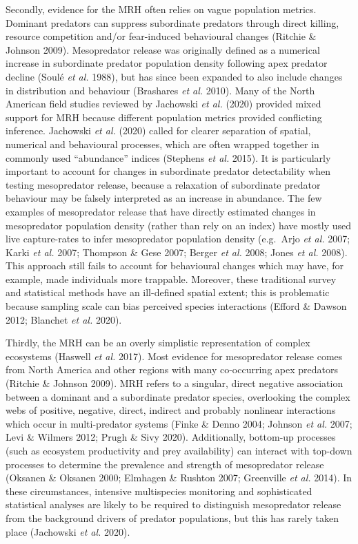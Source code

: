 \documentclass[11pt,a4paper,titlepage,twoside,openright]{style/unimelbthesis}
\begin{document}
\begin{mainmatter}
Secondly, evidence for the MRH often relies on vague population metrics. Dominant predators can suppress subordinate predators through direct killing, resource competition and/or fear-induced behavioural changes (Ritchie \& Johnson 2009). Mesopredator release was originally defined as a numerical increase in subordinate predator population density following apex predator decline (Soulé \emph{et al.} 1988), but has since been expanded to also include changes in distribution and behaviour (Brashares \emph{et al.} 2010). Many of the North American field studies reviewed by Jachowski \emph{et al.} (2020) provided mixed support for MRH because different population metrics provided conflicting inference. Jachowski \emph{et al.} (2020) called for clearer separation of spatial, numerical and behavioural processes, which are often wrapped together in commonly used ``abundance'' indices (Stephens \emph{et al.} 2015). It is particularly important to account for changes in subordinate predator detectability when testing mesopredator release, because a relaxation of subordinate predator behaviour may be falsely interpreted as an increase in abundance. The few examples of mesopredator release that have directly estimated changes in mesopredator population density (rather than rely on an index) have mostly used live capture-rates to infer mesopredator population density (e.g.~Arjo \emph{et al.} 2007; Karki \emph{et al.} 2007; Thompson \& Gese 2007; Berger \emph{et al.} 2008; Jones \emph{et al.} 2008). This approach still fails to account for behavioural changes which may have, for example, made individuals more trappable. Moreover, these traditional survey and statistical methods have an ill-defined spatial extent; this is problematic because sampling scale can bias perceived species interactions (Efford \& Dawson 2012; Blanchet \emph{et al.} 2020).

Thirdly, the MRH can be an overly simplistic representation of complex ecosystems (Haswell \emph{et al.} 2017). Most evidence for mesopredator release comes from North America and other regions with many co-occurring apex predators (Ritchie \& Johnson 2009). MRH refers to a singular, direct negative association between a dominant and a subordinate predator species, overlooking the complex webs of positive, negative, direct, indirect and probably nonlinear interactions which occur in multi-predator systems (Finke \& Denno 2004; Johnson \emph{et al.} 2007; Levi \& Wilmers 2012; Prugh \& Sivy 2020). Additionally, bottom-up processes (such as ecosystem productivity and prey availability) can interact with top-down processes to determine the prevalence and strength of mesopredator release (Oksanen \& Oksanen 2000; Elmhagen \& Rushton 2007; Greenville \emph{et al.} 2014). In these circumstances, intensive multispecies monitoring and sophisticated statistical analyses are likely to be required to distinguish mesopredator release from the background drivers of predator populations, but this has rarely taken place (Jachowski \emph{et al.} 2020).


\end{mainmatter}
\end{document}
